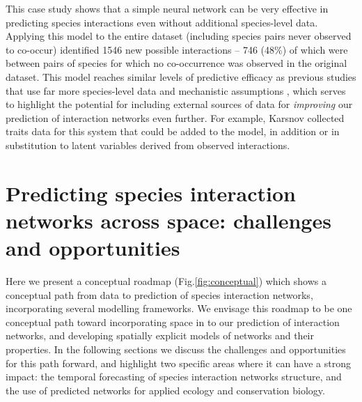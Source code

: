This case study shows that a simple neural network can be very effective
in predicting species interactions even without additional species-level
data. Applying this model to the entire dataset (including species pairs
never observed to co-occur) identified 1546 new possible interactions --
746 (48\%) of which were between pairs of species for which no
co-occurrence was observed in the original dataset. This model reaches
similar levels of predictive efficacy as previous studies that use far
more species-level data and mechanistic assumptions
\cite{Gravel2013InfFoo}, which serves to highlight the potential for
including external sources of data for \emph{improving} our prediction
of interaction networks even further. For example, Karsnov\cite{Krasnov2016TraPhy}
collected traits data for this system that could be added to the model,
in addition or in substitution to latent variables derived from observed
interactions.

\section{Predicting species interaction networks across space:
challenges and
opportunities}\label{predicting-species-interaction-networks-across-space-challenges-and-opportunities}

Here we present a conceptual roadmap (Fig.\ref{fig:conceptual}) which shows a
conceptual path from data to prediction of species interaction networks,
incorporating several modelling frameworks. We envisage this roadmap to
be one conceptual path toward incorporating space in to our prediction
of interaction networks, and developing spatially explicit models of
networks and their properties. In the following sections we discuss the
challenges and opportunities for this path forward, and highlight two
specific areas where it can have a strong impact: the temporal
forecasting of species interaction networks structure, and the use of
predicted networks for applied ecology and conservation biology.

